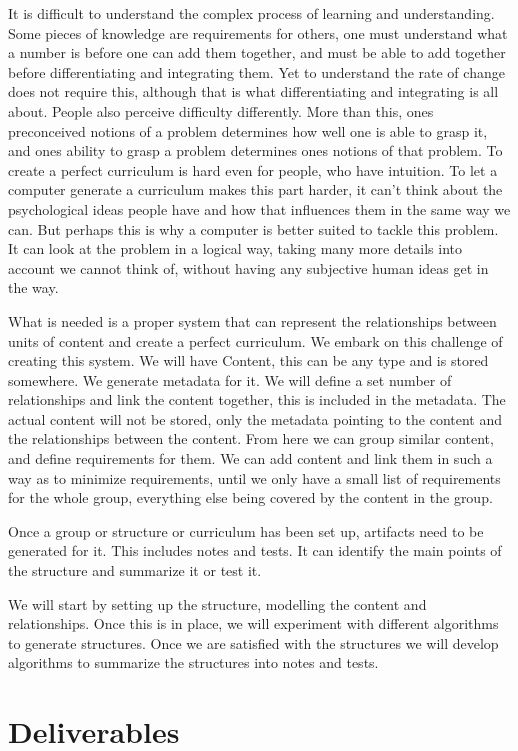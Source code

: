 \documentclass[a4paper]{article}
\begin{document}
It is difficult to understand the complex process of learning and understanding. Some pieces of knowledge are requirements for others, one must understand what a number is before one can add them together, and must be able to add together before differentiating and integrating them. Yet to understand the rate of change does not require this, although that is what differentiating and integrating is all about. People also perceive difficulty differently. More than this, ones preconceived notions of a problem determines how well one is able to grasp it, and ones ability to grasp a problem determines ones notions of that problem. To create a perfect curriculum is hard even for people, who have intuition. To let a computer generate a curriculum makes this part harder, it can't think about the psychological ideas people have and how that influences them in the same way we can. But perhaps this is why a computer is better suited to tackle this problem. It can look at the problem in a logical way, taking many more details into account we cannot think of, without having any subjective human ideas get in the way.

What is needed is a proper system that can represent the relationships between units of content and create a perfect curriculum. We embark on this challenge of creating this system. We will have Content, this can be any type and is stored somewhere. We generate metadata for it. We will define a set number of relationships and link the content together, this is included in the metadata. The actual content will not be stored, only the metadata pointing to the content and the relationships between the content. From here we can group similar content, and define requirements for them. We can add content and link them in such a way as to minimize requirements, until we only have a small list of requirements for the whole group, everything else being covered by the content in the group.

Once a group or structure or curriculum has been set up, artifacts need to be generated for it. This includes notes and tests. It can identify the main points of the structure and summarize it or test it.

We will start by setting up the structure, modelling the content and relationships. Once this is in place, we will experiment with different algorithms to generate structures. Once we are satisfied with the structures we will develop algorithms to summarize the structures into notes and tests.


	\section{Deliverables}
    
\end{document}
